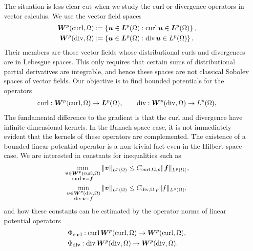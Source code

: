\documentclass[10pt,letterpaper]{article}
\begin{document}
The situation is less clear cut when we study the curl or divergence operators in vector calculus.
We use the vector field spaces
\begin{align*}
    \bm{W}^{p}(\operatorname{curl},\Omega) &:= \left\{ \bm{u} \in \bm{L}^{p}(\Omega) : \operatorname{curl} \bm{u} \in \bm{L}^{p}(\Omega) \right\}
    ,
    \\
    \bm{W}^{p}(\operatorname{div},\Omega) &:= \left\{ \bm{u} \in \bm{L}^{p}(\Omega) : \operatorname{div} \bm{u} \in L^{p}(\Omega) \right\}
    .
\end{align*}
Their members are those vector fields whose distributional curls and divergences are in Lebesgue spaces. 
This only requires that certain sums of distributional partial derivatives are integrable, 
and hence these spaces are not classical Sobolev spaces of vector fields. 
Our objective is to find bounded potentials for the operators 
\begin{align*}
    \operatorname{curl} : \bm{W}^{p}(\operatorname{curl},\Omega) \rightarrow \bm{L}^{p}(\Omega),
    \qquad 
    \operatorname{div} : \bm{W}^{p}(\operatorname{div},\Omega) \rightarrow L^{p}(\Omega),
\end{align*}
The fundamental difference to the gradient is that the curl and divergence have infinite-dimensional kernels. 
In the Banach space case, it is not immediately evident that the kernels of these operators are complemented.
The existence of a bounded linear potential operator is a non-trivial fact even in the Hilbert space case.
We are interested in constants for inequalities such as 
\begin{align*}
    \min\limits_{ \substack{ \bfv \in \bfW^{p}(\curl,\Omega) \\ \curl \bfv = \bff } } 
    \| \bfv \|_{L^{p}(\Omega)}
    &\leq 
    C_{\curl,\Omega,p}
    \| \bff \|_{L^{p}(\Omega)}
    ,
    \\%
    \min\limits_{ \substack{ \bfv \in \bfW^{p}(\divergence,\Omega) \\ \divergence \bfv = f } } 
    \| \bfv \|_{L^{p}(\Omega)}
    &\leq 
    C_{\divergence,\Omega,p}
    \| f \|_{L^{p}(\Omega)}
    ,
\end{align*}
and how these constants can be estimated by the operator norms of linear potential operators 
\begin{align*}
    &\Phi_{\operatorname{curl}} : \operatorname{curl} \bm{W}^{p}(\operatorname{curl},\Omega) \rightarrow \bm{W}^{p}(\operatorname{curl},\Omega)
    ,
    \\
    &\Phi_{\operatorname{div}} : \operatorname{div} \bm{W}^{p}(\operatorname{div},\Omega) \rightarrow \bm{W}^{p}(\operatorname{div},\Omega)
    .
\end{align*}
\end{document}
